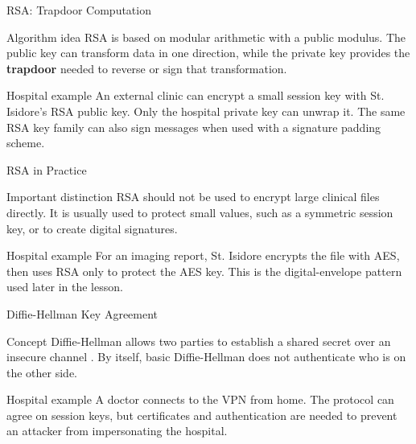 \documentclass[presentation]{beamer}
\begin{document}
\begin{frame}[c]{RSA: Trapdoor Computation}
\begin{block}{Algorithm idea}
RSA is based on modular arithmetic with a public modulus. The public key can transform data in one
direction, while the private key provides the \textbf{trapdoor} needed to reverse or sign that
transformation.
\end{block}

\begin{exampleblock}{Hospital example}
An external clinic can encrypt a small session key with St. Isidore's RSA public key. Only the
hospital private key can unwrap it. The same RSA key family can also sign messages when used with a
signature padding scheme.
\end{exampleblock}
\end{frame}

\begin{frame}[c]{RSA in Practice}
\begin{block}{Important distinction}
RSA should not be used to encrypt large clinical files directly. It is usually used to protect
small values, such as a symmetric session key, or to create digital signatures.
\end{block}

\begin{exampleblock}{Hospital example}
For an imaging report, St. Isidore encrypts the file with AES, then uses RSA only to protect the
AES key. This is the digital-envelope pattern used later in the lesson.
\end{exampleblock}
\end{frame}

\begin{frame}[c]{Diffie-Hellman Key Agreement}
\begin{block}{Concept}
Diffie-Hellman allows two parties to establish a shared secret over an insecure channel
\cite{diffie_hellman_1976}. By itself, basic Diffie-Hellman does not authenticate who is on the
other side.
\end{block}

\begin{exampleblock}{Hospital example}
A doctor connects to the VPN from home. The protocol can agree on session keys, but certificates
and authentication are needed to prevent an attacker from impersonating the hospital.
\end{exampleblock}
\end{frame}
\end{document}
